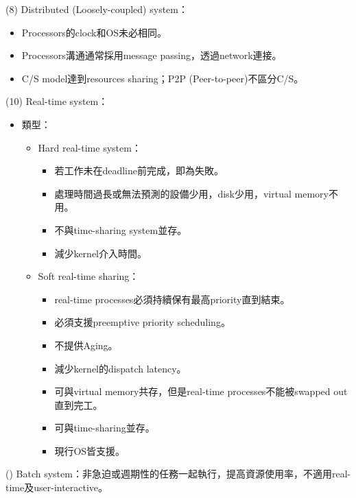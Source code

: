 \begin{theorem}{(8)} Distributed (Loosely-coupled) system：\begin{itemize}
        \item Processors的clock和OS未必相同。
        \item Processors溝通通常採用message passing，透過network連接。
        \item C/S model達到resources sharing；P2P (Peer-to-peer)不區分C/S。
    \end{itemize}
\end{theorem}

\begin{theorem}{(10)} Real-time system：\begin{itemize}
        \item 類型：\begin{itemize}
            \item Hard real-time system：\begin{itemize}
                \item 若工作未在deadline前完成，即為失敗。
                \item 處理時間過長或無法預測的設備少用，disk少用，virtual memory不用。
                \item 不與time-sharing system並存。
                \item 減少kernel介入時間。
            \end{itemize}
            \item Soft real-time sharing：\begin{itemize}
                \item real-time processes必須持續保有最高priority直到結束。
                \item 必須支援preemptive priority scheduling。
                \item 不提供Aging。
                \item 減少kernel的dispatch latency。
                \item 可與virtual memory共存，但是real-time processes不能被swapped out直到完工。
                \item 可與time-sharing並存。
                \item 現行OS皆支援。
            \end{itemize}
        \end{itemize}
    \end{itemize}
\end{theorem}

\begin{theorem}{()} Batch system：非急迫或週期性的任務一起執行，提高資源使用率，不適用real-time及user-interactive。
\end{theorem}
